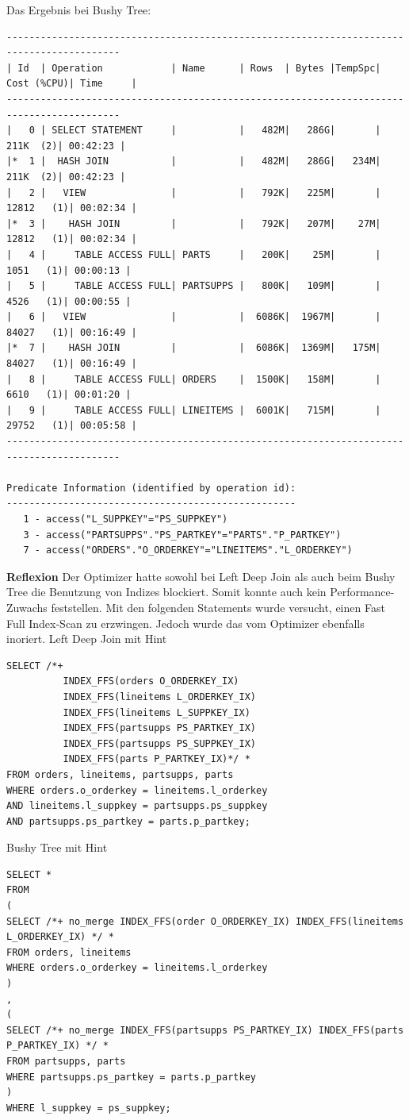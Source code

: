 \documentclass[10pt]{article}
\begin{document}
Das Ergebnis bei Bushy Tree:
\begin{lstlisting}[style=queryexecutionplan]
------------------------------------------------------------------------------------------
| Id  | Operation            | Name      | Rows  | Bytes |TempSpc| Cost (%CPU)| Time     |
------------------------------------------------------------------------------------------
|   0 | SELECT STATEMENT     |           |   482M|   286G|       |   211K  (2)| 00:42:23 |
|*  1 |  HASH JOIN           |           |   482M|   286G|   234M|   211K  (2)| 00:42:23 |
|   2 |   VIEW               |           |   792K|   225M|       | 12812   (1)| 00:02:34 |
|*  3 |    HASH JOIN         |           |   792K|   207M|    27M| 12812   (1)| 00:02:34 |
|   4 |     TABLE ACCESS FULL| PARTS     |   200K|    25M|       |  1051   (1)| 00:00:13 |
|   5 |     TABLE ACCESS FULL| PARTSUPPS |   800K|   109M|       |  4526   (1)| 00:00:55 |
|   6 |   VIEW               |           |  6086K|  1967M|       | 84027   (1)| 00:16:49 |
|*  7 |    HASH JOIN         |           |  6086K|  1369M|   175M| 84027   (1)| 00:16:49 |
|   8 |     TABLE ACCESS FULL| ORDERS    |  1500K|   158M|       |  6610   (1)| 00:01:20 |
|   9 |     TABLE ACCESS FULL| LINEITEMS |  6001K|   715M|       | 29752   (1)| 00:05:58 |
------------------------------------------------------------------------------------------
 
Predicate Information (identified by operation id):
---------------------------------------------------
   1 - access("L_SUPPKEY"="PS_SUPPKEY")
   3 - access("PARTSUPPS"."PS_PARTKEY"="PARTS"."P_PARTKEY")
   7 - access("ORDERS"."O_ORDERKEY"="LINEITEMS"."L_ORDERKEY")
\end{lstlisting}
\textbf{Reflexion} \newline
Der Optimizer hatte sowohl bei Left Deep Join als auch beim Bushy Tree die Benutzung von Indizes blockiert.
Somit konnte auch kein Performance-Zuwachs feststellen. \newline
Mit den folgenden Statements wurde versucht, einen Fast Full Index-Scan zu erzwingen. Jedoch wurde das vom Optimizer ebenfalls inoriert.\newline
Left Deep Join mit Hint
\begin{lstlisting}[style=sql]
SELECT /*+ 
          INDEX_FFS(orders O_ORDERKEY_IX) 
          INDEX_FFS(lineitems L_ORDERKEY_IX) 
          INDEX_FFS(lineitems L_SUPPKEY_IX) 
          INDEX_FFS(partsupps PS_PARTKEY_IX) 
          INDEX_FFS(partsupps PS_SUPPKEY_IX) 
          INDEX_FFS(parts P_PARTKEY_IX)*/ *
FROM orders, lineitems, partsupps, parts
WHERE orders.o_orderkey = lineitems.l_orderkey
AND lineitems.l_suppkey = partsupps.ps_suppkey
AND partsupps.ps_partkey = parts.p_partkey;
\end{lstlisting}
Bushy Tree mit Hint
\begin{lstlisting}[style=sql]
SELECT *
FROM 
(
SELECT /*+ no_merge INDEX_FFS(order O_ORDERKEY_IX) INDEX_FFS(lineitems L_ORDERKEY_IX) */ *
FROM orders, lineitems
WHERE orders.o_orderkey = lineitems.l_orderkey
)
,
(
SELECT /*+ no_merge INDEX_FFS(partsupps PS_PARTKEY_IX) INDEX_FFS(parts P_PARTKEY_IX) */ *
FROM partsupps, parts
WHERE partsupps.ps_partkey = parts.p_partkey
)
WHERE l_suppkey = ps_suppkey;
\end{lstlisting}
\end{document}

